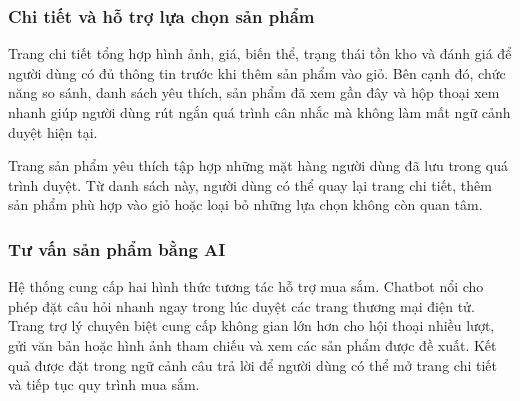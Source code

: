 

\subsubsection{Chi tiết và hỗ trợ lựa chọn sản phẩm}

Trang chi tiết tổng hợp hình ảnh, giá, biến thể, trạng thái tồn kho và đánh giá để người dùng có đủ
thông tin trước khi thêm sản phẩm vào giỏ. Bên cạnh đó, chức năng so sánh, danh sách yêu thích, sản
phẩm đã xem gần đây và hộp thoại xem nhanh giúp người dùng rút ngắn quá trình cân nhắc mà không làm
mất ngữ cảnh duyệt hiện tại.


Trang sản phẩm yêu thích tập hợp những mặt hàng người dùng đã lưu trong quá trình duyệt. Từ danh
sách này, người dùng có thể quay lại trang chi tiết, thêm sản phẩm phù hợp vào giỏ hoặc loại bỏ
những lựa chọn không còn quan tâm.


\subsubsection{Tư vấn sản phẩm bằng AI}

Hệ thống cung cấp hai hình thức tương tác hỗ trợ mua sắm. Chatbot nổi cho phép đặt câu hỏi nhanh
ngay trong lúc duyệt các trang thương mại điện tử. Trang trợ lý chuyên biệt cung cấp không gian lớn
hơn cho hội thoại nhiều lượt, gửi văn bản hoặc hình ảnh tham chiếu và xem các sản phẩm được đề xuất.
Kết quả được đặt trong ngữ cảnh câu trả lời để người dùng có thể mở trang chi tiết và tiếp tục quy
trình mua sắm.



